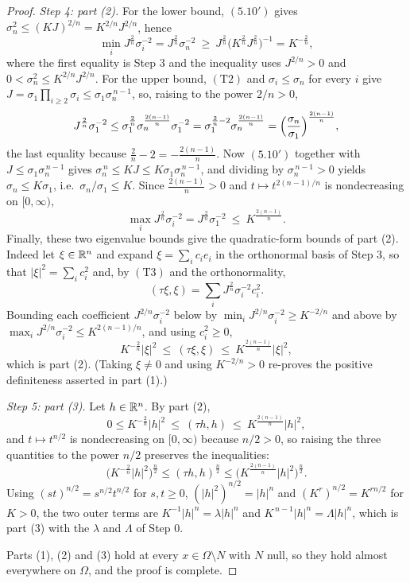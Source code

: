 \begin{proof}
\emph{Step 4: part (2).}  For the lower bound, $(5.10')$ gives
$\sigma_n^2\le(KJ)^{2/n}=K^{2/n}J^{2/n}$, hence
\[
\min_i J^{\frac2n}\sigma_i^{-2}=J^{\frac2n}\sigma_n^{-2}
\ \ge\ J^{\frac2n}\bigl(K^{\frac2n}J^{\frac2n}\bigr)^{-1}=K^{-\frac2n} ,
\]
where the first equality is Step 3 and the inequality uses $J^{2/n}>0$ and
$0<\sigma_n^2\le K^{2/n}J^{2/n}$.  For the upper bound, $(\mathrm{T2})$ and
$\sigma_i\le\sigma_n$ for every $i$ give
$J=\sigma_1\prod_{i\ge2}\sigma_i\le\sigma_1\sigma_n^{\,n-1}$, so, raising to the
power $2/n>0$,
\[
J^{\frac2n}\sigma_1^{-2}
\le\sigma_1^{\frac2n}\sigma_n^{\frac{2(n-1)}n}\sigma_1^{-2}
=\sigma_1^{\frac2n-2}\sigma_n^{\frac{2(n-1)}n}
=\Bigl(\frac{\sigma_n}{\sigma_1}\Bigr)^{\frac{2(n-1)}n} ,
\]
the last equality because $\frac2n-2=-\frac{2(n-1)}n$.  Now $(5.10')$ together
with $J\le\sigma_1\sigma_n^{\,n-1}$ gives
$\sigma_n^{\,n}\le KJ\le K\sigma_1\sigma_n^{\,n-1}$, and dividing by
$\sigma_n^{\,n-1}>0$ yields $\sigma_n\le K\sigma_1$, i.e.\
$\sigma_n/\sigma_1\le K$.  Since $\frac{2(n-1)}n>0$ and $t\mapsto
t^{2(n-1)/n}$ is nondecreasing on $[0,\infty)$,
\[
\max_i J^{\frac2n}\sigma_i^{-2}=J^{\frac2n}\sigma_1^{-2}
\ \le\ K^{\frac{2(n-1)}n} .
\]
Finally, these two eigenvalue bounds give the quadratic-form bounds of part (2).
Indeed let $\xi\in\mathbb{R}^n$ and expand $\xi=\sum_i c_ie_i$ in the orthonormal basis
of Step 3, so that $|\xi|^2=\sum_ic_i^2$ and, by $(\mathrm{T3})$ and the orthonormality,
\[
(\tau\xi,\xi)=\sum_{i}J^{\frac2n}\sigma_i^{-2}c_i^2 .
\]
Bounding each coefficient $J^{2/n}\sigma_i^{-2}$ below by
$\min_iJ^{2/n}\sigma_i^{-2}\ge K^{-2/n}$ and above by
$\max_iJ^{2/n}\sigma_i^{-2}\le K^{2(n-1)/n}$, and using $c_i^2\ge0$,
\[
K^{-\frac2n}|\xi|^2\ \le\ (\tau\xi,\xi)\ \le\ K^{\frac{2(n-1)}n}|\xi|^2 ,
\]
which is part (2).  (Taking $\xi\ne0$ and using $K^{-2/n}>0$ re-proves the
positive definiteness asserted in part (1).)

\emph{Step 5: part (3).}  Let $h\in\mathbb{R}^n$.  By part (2),
\[
0\le K^{-\frac2n}|h|^2\ \le\ (\tau h,h)\ \le\ K^{\frac{2(n-1)}n}|h|^2 ,
\]
and $t\mapsto t^{n/2}$ is nondecreasing on $[0,\infty)$ because $n/2>0$, so
raising the three quantities to the power $n/2$ preserves the inequalities:
\[
\bigl(K^{-\frac2n}|h|^2\bigr)^{\frac n2}\le(\tau h,h)^{\frac n2}
\le\bigl(K^{\frac{2(n-1)}n}|h|^2\bigr)^{\frac n2} .
\]
Using $(st)^{n/2}=s^{n/2}t^{n/2}$ for $s,t\ge0$, $(|h|^2)^{n/2}=|h|^{n}$ and
$(K^{r})^{n/2}=K^{rn/2}$ for $K>0$, the two outer terms are
$K^{-1}|h|^{n}=\lambda|h|^{n}$ and
$K^{\,n-1}|h|^{n}=\Lambda|h|^{n}$, which is part (3) with the $\lambda$ and
$\Lambda$ of Step 0.

Parts (1), (2) and (3) hold at every $x\in\Omega\setminus N$ with $N$ null, so
they hold almost everywhere on $\Omega$, and the proof is complete.
\end{proof}
